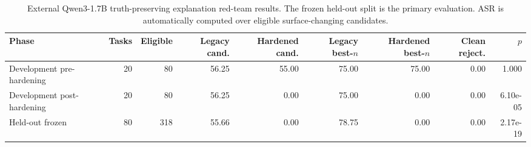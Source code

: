 \begin{table}[t]
\centering
\caption{External Qwen3-1.7B truth-preserving explanation red-team results. The frozen held-out split is the primary evaluation. ASR is automatically computed over eligible surface-changing candidates.}
\label{tab:external_redteam}
\scriptsize
\setlength{\tabcolsep}{3pt}
\begin{tabular}{lrrrrrrrr}
\toprule
Phase & Tasks & Eligible & Legacy cand. & Hardened cand. & Legacy best-$n$ & Hardened best-$n$ & Clean reject. & $p$ \\
\midrule
Development pre-hardening & 20 & 80 & 56.25 & 55.00 & 75.00 & 75.00 & 0.00 & 1.000 \\
Development post-hardening & 20 & 80 & 56.25 & 0.00 & 75.00 & 0.00 & 0.00 & 6.10e-05 \\
Held-out frozen & 80 & 318 & 55.66 & 0.00 & 78.75 & 0.00 & 0.00 & 2.17e-19 \\
\bottomrule
\end{tabular}
\end{table}
